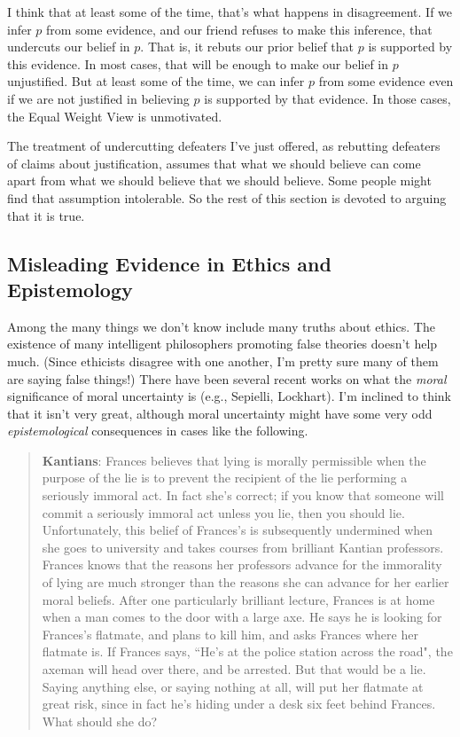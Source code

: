 I think that at least some of the time, that's what happens in disagreement. If we infer \(p\) from some evidence, and our friend refuses to make this inference, that undercuts our belief in \(p\). That is, it rebuts our prior belief that \(p\) is supported by this evidence. In most cases, that will be enough to make our belief in \(p\) unjustified. But at least some of the time, we can infer \(p\) from some evidence even if we are not justified in believing \(p\) is supported by that evidence. In those cases, the Equal Weight View is unmotivated.

The treatment of undercutting defeaters I've just offered, as rebutting defeaters of claims about justification, assumes that what we should believe can come apart from what we should believe that we should believe. Some people might find that assumption intolerable. So the rest of this section is devoted to arguing that it is true.

\subsection{Misleading Evidence in Ethics and Epistemology}

Among the many things we don't know include many truths about ethics. The existence of many intelligent philosophers promoting false theories doesn't help much. (Since ethicists disagree with one another, I'm pretty sure many of them are saying false things!) There have been several recent works on what the \textit{moral} significance of moral uncertainty is (e.g., Sepielli, Lockhart). I'm inclined to think that it isn't very great, although moral uncertainty might have some very odd \textit{epistemological} consequences in cases like the following.

\begin{quote} \textbf{Kantians}: Frances believes that lying is morally permissible when the purpose of the lie is to prevent the recipient of the lie performing a seriously immoral act. In fact she's correct; if you know that someone will commit a seriously immoral act unless you lie, then you should lie. Unfortunately, this belief of Frances's is subsequently undermined when she goes to university and takes courses from brilliant Kantian professors. Frances knows that the reasons her professors advance for the immorality of lying are much stronger than the reasons she can advance for her earlier moral beliefs. After one particularly brilliant lecture, Frances is at home when a man comes to the door with a large axe. He says he is looking for Frances's flatmate, and plans to kill him, and asks Frances where her flatmate is. If Frances says, ``He's at the police station across the road", the axeman will head over there, and be arrested. But that would be a lie. Saying anything else, or saying nothing at all, will put her flatmate at great risk, since in fact he's hiding under a desk six feet behind Frances. What should she do? \end{quote}

